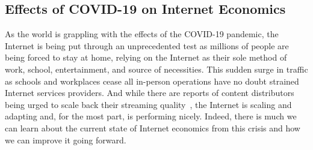 \documentclass[journal]{IEEEtran}
\begin{document}
\subsection{Effects of COVID-19 on Internet Economics}
As the world is grappling with the effects of the COVID-19 pandemic, the Internet is being put through an unprecedented test as millions of people are being forced to stay at home, relying on the Internet as their sole method of work, school, entertainment, and source of necessities. This sudden surge in traffic as schools and workplaces cease all in-person operations have no doubt strained Internet services providers. And while there are reports of content distributors being urged to scale back their streaming quality~\cite{Forbes_Scaleback}, the Internet is scaling and adapting and, for the most part, is performing nicely. Indeed, there is much we can learn about the current state of Internet economics from this crisis and how we can improve it going forward.
\end{document}
